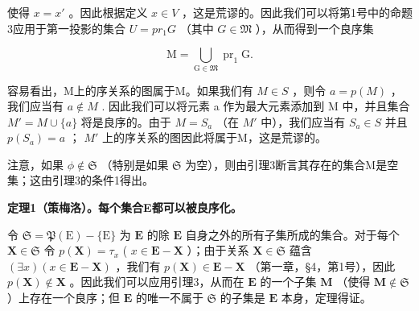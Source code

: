 使得 \(x = x'\) 。因此根据定义 \(x \in V\) ，这是荒谬的。因此我们可以将第1号中的命题3应用于第一投影的集合 \(U = pr_1G\) （其中 \(G \in \mathfrak{M}\) ），从而得到一个良序集

\[
\mathrm{M} = \bigcup_ {\mathrm{G} \in \mathfrak {M}} \operatorname{pr} _ {1} \mathrm{G}.
\]

容易看出，M上的序关系的图属于M。如果我们有 \(M \in S\) ，则令 \(a = p(M)\) ，我们应当有 \(a \notin M\) . 因此我们可以将元素 a 作为最大元素添加到 M 中，并且集合 \(M' = M \cup \{a\}\) 将是良序的。由于 \(M = S_a\) （在 \(M'\) 中），我们应当有 \(S_a \in S\) 并且 \(p(S_a) = a\) ； \(M'\) 上的序关系的图因此将属于M，这是荒谬的。

注意，如果 \(\phi \notin \mathfrak{S}\) （特别是如果 \(\mathfrak{S}\) 为空），则由引理3断言其存在的集合M是空集；这由引理3的条件1得出。

\textbf{定理1（策梅洛）。每个集合E都可以被良序化。}

令 \(\mathfrak{S} = \mathfrak{P}(\mathrm{E}) - \{\mathrm{E}\}\) 为 \(\mathbf{E}\) 的除 \(\mathbf{E}\) 自身之外的所有子集所成的集合。对于每个 \(\mathbf{X} \in \mathfrak{S}\) 令 \(p(\mathbf{X}) = \tau_x\) ( \(x \in \mathbf{E} - \mathbf{X}\) ）；由于关系 \(\mathbf{X} \in \mathfrak{S}\) 蕴含 \((\exists x)(x \in \mathbf{E} - \mathbf{X})\) ，我们有 \(p(\mathbf{X}) \in \mathbf{E} - \mathbf{X}\) （第一章，§4，第1号），因此 \(p(\mathbf{X}) \notin \mathbf{X}\) 。因此我们可以应用引理3，从而在 \(\mathbf{E}\) 的一个子集 \(\mathbf{M}\) （使得 \(\mathbf{M} \notin \mathfrak{S}\) ）上存在一个良序；但 \(\mathbf{E}\) 的唯一不属于 \(\mathfrak{S}\) 的子集是 \(\mathbf{E}\) 本身，定理得证。

